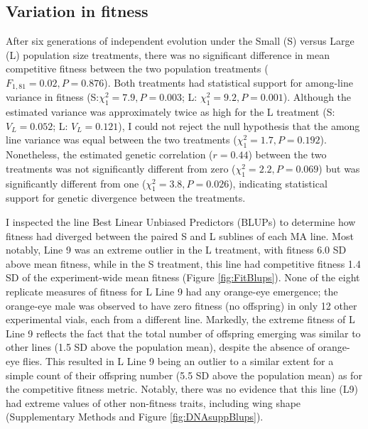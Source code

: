\subsection{Variation in fitness}
After six generations of independent evolution under the Small (S) versus Large (L) population size treatments, there was no significant difference in mean competitive fitness between the two population treatments ($F_{1,81} =0.02, P = 0.876$). Both treatments had statistical support for among-line variance in fitness (S:$\chi_1^{2} = 7.9, P = 0.003$; L: $\chi_1^{2} = 9.2, P = 0.001$). Although the estimated variance was approximately twice as high for the L treatment (S: $V_L = 0.052$; L: $V_L = 0.121$), I could not reject the null hypothesis that the among line variance was equal between the two treatments ($\chi_1^{2} =1.7, P = 0.192$). Nonetheless, the estimated genetic correlation ($r = 0.44$) between the two treatments was not significantly different from zero ($\chi_1^{2}= 2.2, P =0.069$) but was significantly different from one ($\chi_1^{2} = 3.8, P =0.026$), indicating statistical support for genetic divergence between the treatments. \par

I inspected the line Best Linear Unbiased Predictors (BLUPs) to determine how fitness had diverged between the paired S and L sublines of each MA line. Most notably, Line 9 was an extreme outlier in the L treatment, with fitness 6.0 SD above mean fitness, while in the S treatment, this line had competitive fitness 1.4 SD of the experiment-wide mean fitness (Figure \ref{fig:FitBlups}). None of the eight replicate measures of fitness for L Line 9 had any orange-eye emergence; the orange-eye male was observed to have zero fitness (no offspring) in only 12 other experimental vials, each from a different line. Markedly, the extreme fitness of L Line 9 reflects the fact that the total number of offspring emerging was similar to other lines (1.5 SD above the population mean), despite the absence of orange-eye flies. This resulted in L Line 9 being an outlier to a similar extent for a simple count of their offspring number (5.5 SD above the population mean) as for the competitive fitness metric. Notably, there was no evidence that this line (L9) had extreme values of other non-fitness traits, including wing shape (Supplementary Methods and Figure \ref{fig:DNAsuppBlups}). \par

